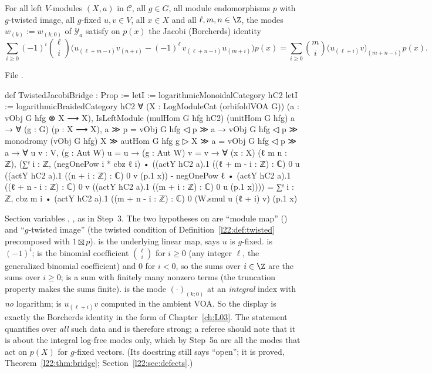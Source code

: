 \begin{definition}\label{l22:def:bridge}
For all left $V$-modules $(X,a)$ in $\mathcal C$, all $g\in G$, all module endomorphisms $p$ with $g$-twisted image, all
$g$-fixed $u,v\in V$, all $x\in X$ and all $\ell,m,n\in\Z$, the modes $w_{(k)}:=w_{(k;0)}$ of $\mathcal Y_a$ satisfy on
$p(x)$ the Jacobi (Borcherds) identity
\begin{equation*}
  \sum_{i\ge0}(-1)^i\binom{\ell}{i}\Big(u_{(\ell+m-i)}v_{(n+i)}-(-1)^{\ell}\,v_{(\ell+n-i)}u_{(m+i)}\Big)p(x)
  =\sum_{i\ge0}\binom mi\big(u_{(\ell+i)}v\big)_{(m+n-i)}p(x).
\end{equation*}
\end{definition}
\noindent File .
\begin{leancode}
def TwistedJacobiBridge : Prop :=
  letI := logarithmicMonoidalCategory hC2
  letI := logarithmicBraidedCategory hC2
  ∀ (X : LogModuleCat (orbifoldVOA G)) (a : vObj G hfg ⊗ X ⟶ X),
    IsLeftModule (mulHom G hfg hC2) (unitHom G hfg) a →
    ∀ (g : G) (p : X ⟶ X), a ≫ p = vObj G hfg ◁ p ≫ a →
      vObj G hfg ◁ p ≫ monodromy (vObj G hfg) X ≫ autHom G hfg g ▷ X ≫ a =
        vObj G hfg ◁ p ≫ a →
      ∀ u v : V, (g : Aut W) u = u → (g : Aut W) v = v → ∀ (x : X) (ℓ m n : ℤ),
        (∑ᶠ i : ℤ, (negOnePow i * cbz ℓ i) •
            ((actY hC2 a).1 ((ℓ + m - i : ℤ) : ℂ) 0 u
                ((actY hC2 a).1 ((n + i : ℤ) : ℂ) 0 v (p.1 x))
              - negOnePow ℓ • (actY hC2 a).1 ((ℓ + n - i : ℤ) : ℂ) 0 v
                  ((actY hC2 a).1 ((m + i : ℤ) : ℂ) 0 u (p.1 x))))
          = ∑ᶠ i : ℤ, cbz m i •
              (actY hC2 a).1 ((m + n - i : ℤ) : ℂ) 0 (W.smul u (ℓ + i) v) (p.1 x)
\end{leancode}

\begin{dictionary}
Section variables , ,  as in Step~3. The two hypotheses on  are ``module map''
() and ``$g$-twisted image'' (the twisted condition of Definition~\ref{l22:def:twisted}
precomposed with $1\boxtimes p$).  is the underlying linear map,  says $u$ is
$g$-fixed.  is $(-1)^i$;  is the binomial coefficient $\binom{\ell}{i}$ for $i\ge0$ (any
integer $\ell$, the generalized binomial coefficient) and $0$ for $i<0$, so the sums over $i\in\Z$ are the sums over
$i\ge0$;  is a sum with finitely many nonzero terms (the truncation property makes the sums finite).
 is the mode $(\cdot)_{(k;0)}$ at an \emph{integral} index with \emph{no}
logarithm;  is $u_{(\ell+i)}v$ computed in the ambient VOA. So the display is exactly the
Borcherds identity in the form of Chapter~\ref{ch:L03}. The statement quantifies over \emph{all} such data and is
therefore strong; a referee should note that it is about the integral log-free modes only, which by Step~5a are all the
modes that act on $p(X)$ for $g$-fixed vectors. (Its docstring still says ``open''; it is proved,
Theorem~\ref{l22:thm:bridge}; Section~\ref{l22:sec:defects}.)
\end{dictionary}

